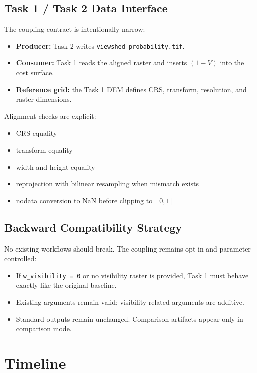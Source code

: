 \documentclass[11pt]{article}
\let\oldsection\section
\renewcommand{\section}{\clearpage\oldsection}
\begin{document}
\subsection{Task 1 / Task 2 Data Interface}

The coupling contract is intentionally narrow:

\begin{itemize}
  \item \textbf{Producer:} Task 2 writes \texttt{viewshed\_probability.tif}.
  \item \textbf{Consumer:} Task 1 reads the aligned raster and inserts $(1-V)$ into the cost surface.
  \item \textbf{Reference grid:} the Task 1 DEM defines CRS, transform, resolution, and raster dimensions.
\end{itemize}

Alignment checks are explicit:

\begin{itemize}
  \item CRS equality
  \item transform equality
  \item width and height equality
  \item reprojection with bilinear resampling when mismatch exists
  \item nodata conversion to NaN before clipping to $[0,1]$
\end{itemize}

\subsection{Backward Compatibility Strategy}

No existing workflows should break. The coupling remains opt-in and parameter-controlled:

\begin{itemize}
  \item If \texttt{w\_visibility = 0} or no visibility raster is provided, Task 1 must behave exactly like the original baseline.
  \item Existing arguments remain valid; visibility-related arguments are additive.
  \item Standard outputs remain unchanged. Comparison artifacts appear only in comparison mode.
\end{itemize}

\section{Timeline}
\end{document}
